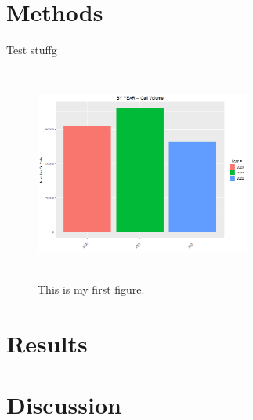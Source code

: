 \documentclass[12pt]{article}
\begin{document}
\section*{Methods}
Test stuffg
\begin{figure}[H]
    \centering
    \includegraphics[width=200pt,height=200pt]{By Year.png}
    \caption{This is my first figure.}
    \label{fig:Year}
  \end{figure}

\section*{Results}
\citep{avramidis2005modeling}
\citep{evensen1999effective}
\citep{ibrahim2016modeling}


\section*{Discussion}




\end{document}
